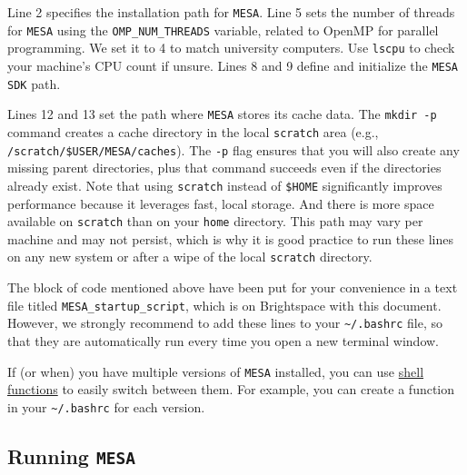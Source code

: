 \documentclass[11pt,a4paper]{article}
\begin{document}
Line 2 specifies the installation path for \texttt{MESA}. 
Line 5 sets the number of threads for \texttt{MESA} using the \texttt{OMP\_NUM\_THREADS} variable, related to OpenMP for parallel programming. We set it to 4 to match university computers. 
Use \texttt{lscpu} to check your machine's CPU count if unsure. 
Lines 8 and 9 define and initialize the \texttt{MESA SDK} path.


Lines 12 and 13 set the path where \texttt{MESA} stores its cache data. 
The \texttt{mkdir -p} command creates a cache directory in the local \texttt{scratch} area (e.g., \texttt{/scratch/\$USER/MESA/caches}). The \texttt{-p} flag ensures that you will also create any missing parent directories, plus that command succeeds even if the directories already exist.
%
Note that using \texttt{scratch} instead of \texttt{\$HOME} significantly improves performance because it leverages fast, local storage. And there is more space available on \texttt{scratch} than on your \texttt{home} directory. This path may vary per machine and may not persist, which is why it is good practice to run these lines on any new system or after a wipe of the local \texttt{scratch} directory.


\bigskip\noindent
The block of code mentioned above have been put for your convenience in a text file titled \texttt{MESA\_startup\_script}, which is on Brightspace with this document. 
However, we strongly recommend to add these lines to your \verb|~/.bashrc| file, so that they are automatically run every time you open a new terminal window.

\begin{tcolorbox}[protipbox]
If (or when) you have multiple versions of \texttt{MESA} installed, you can use \href{https://www.gnu.org/software/bash/manual/html_node/Shell-Functions.html}{shell functions} to easily switch between them. For example, you can create a function in your \verb|~/.bashrc| for each version.
\end{tcolorbox}




\subsection{Running \texttt{MESA}}
\end{document}
